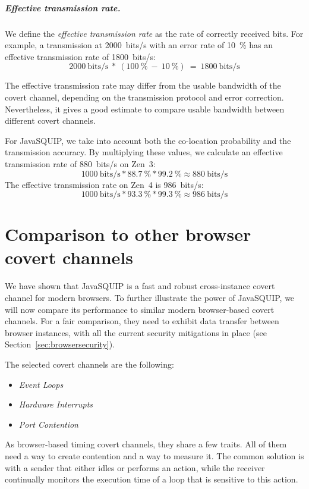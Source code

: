 \documentclass[11pt,
  titlepage=false,
  parskip=half,      %
]{scrreprt}
\begin{document}
\paragraph{Effective transmission rate.}
We define the \textit{effective transmission rate} as the rate of correctly received bits.
For example, a transmission at 2000~bits/s with an error rate of 10~\%
has an effective transmission rate of 1800~bits/s:
\[2000~\text{bits/s}~*~(100~\%~-~10~\%)~=~1800~\text{bits/s}\]

The effective transmission rate may differ from the usable bandwidth of the covert channel,
depending on the transmission protocol and error correction.
Nevertheless, it gives a good estimate to compare usable bandwidth between different covert channels.

For JavaSQUIP, we take into account both the co-location probability and the transmission accuracy.
By multiplying these values, we calculate an effective transmission rate of 880~bits/s on Zen~3:
\[1000~\text{bits/s} * 88.7~\% * 99.2~\% \approx 880~\text{bits/s}\]
The effective transmission rate on Zen~4 is 986~bits/s:
\[1000~\text{bits/s} * 93.3~\% * 99.3~\% \approx 986~\text{bits/s}\]

\chapter{Comparison to other browser covert channels}
\label{ch:comparison}
We have shown that JavaSQUIP is a fast and robust cross-instance covert channel for modern browsers.
To further illustrate the power of JavaSQUIP,
we will now compare its performance to similar modern browser-based covert channels.
For a fair comparison, they need to exhibit data transfer between browser instances,
with all the current security mitigations in place (see Section~\ref{sec:browsersecurity}).

\pagebreak
The selected covert channels are the following:
\begin{itemize}
    \item \textit{Event Loops}~\cite{vila2017loophole}
    \item \textit{Hardware Interrupts}~\cite{lipp2017practical}
    \item \textit{Port Contention}~\cite{Rokicki2022webport}
\end{itemize}

As browser-based timing covert channels, they share a few traits.
All of them need a way to create contention and a way to measure it.
The common solution is with a sender that either idles or performs an action,
while the receiver continually monitors the execution time of a loop that is sensitive to this action.
\end{document}
